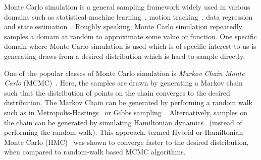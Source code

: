 \documentclass[letterpaper, 10 pt, conference]{ieeeconf}  %
\begin{document}
Monte Carlo simulation is a general sampling framework widely used in various domains such as
statistical machine learning~\cite{M97},
motion tracking~\cite{KBD04}, 
data regression~\cite{TL11} and 
state estimation~\cite{ASC13}.
Roughly speaking, Monte Carlo simulation repeatedly samples a domain at random to approximate some value or function.
One specific domain where Monte Carlo simulation is used which is of specific interest to us is generating draws from a desired distribution which is hard to sample directly.

One of the popular classes of Monte Carlo simulation is 
\emph{Markov Chain Monte Carlo} (MCMC)~\cite{ADDJ03}.
Here, the samples are drawn by generating a Markov chain such that the distribution of points on the chain converges to the desired distribution.
The Markov Chain can be generated by performing a random walk such as
in Metropolis-Hastings~\cite{CG95} or Gibbs sampling~\cite{CK94}.
Alternatively, samples on the chain can be generated by simulating Hamiltonian dynamics~\cite{N94} (instead of performing the random walk).
This approach, termed Hybrid or Hamiltonian Monte Carlo (HMC)~\cite{N11} was shown to converge faster to the desired distribution, when compared to random-walk based MCMC algorithms.
\end{document}
